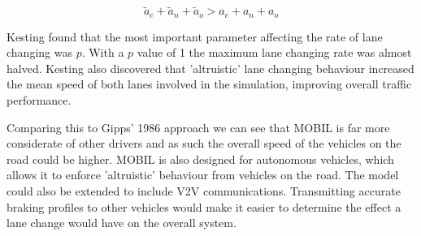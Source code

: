 \begin{equation}
\tilde{a}_c + \tilde{a}_n + \tilde{a}_o > a_c + a_n + a_o 
\end{equation}

Kesting found that the most important parameter affecting the rate of lane changing was $p$. With a $p$ value of 1 the maximum lane changing rate was almost halved. Kesting also discovered that 'altruistic' lane changing behaviour increased the mean speed of both lanes involved in the simulation, improving overall traffic performance.

Comparing this to Gipps' 1986 approach we can see that MOBIL is far more considerate of other drivers and as such the overall speed of the vehicles on the road could be higher. MOBIL is also designed for autonomous vehicles, which allows it to enforce 'altruistic' behaviour from vehicles on the road. The model could also be extended to include V2V communications. Transmitting accurate braking profiles to other vehicles would make it easier to determine the effect a lane change would have on the overall system.